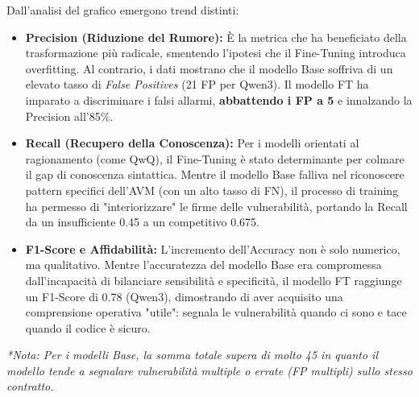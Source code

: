 Dall'analisi del grafico emergono trend distinti:
\begin{itemize}
    \item \textbf{Precision (Riduzione del Rumore):} È la metrica che ha beneficiato della trasformazione più radicale, smentendo l'ipotesi che il Fine-Tuning introduca overfitting. Al contrario, i dati mostrano che il modello Base soffriva di un elevato tasso di \textit{False Positives} (21 FP per Qwen3). Il modello FT ha imparato a discriminare i falsi allarmi, \textbf{abbattendo i FP a 5} e innalzando la Precision all'85\%.
    
    \item \textbf{Recall (Recupero della Conoscenza):} Per i modelli orientati al ragionamento (come QwQ), il Fine-Tuning è stato determinante per colmare il gap di conoscenza sintattica. Mentre il modello Base falliva nel riconoscere pattern specifici dell'AVM (con un alto tasso di FN), il processo di training ha permesso di "interiorizzare" le firme delle vulnerabilità, portando la Recall da un insufficiente 0.45 a un competitivo 0.675.
    
    \item \textbf{F1-Score e Affidabilità:} L'incremento dell'Accuracy non è solo numerico, ma qualitativo. Mentre l'accuratezza del modello Base era compromessa dall'incapacità di bilanciare sensibilità e specificità, il modello FT raggiunge un F1-Score di 0.78 (Qwen3), dimostrando di aver acquisito una comprensione operativa "utile": segnala le vulnerabilità quando ci sono e tace quando il codice è sicuro.
\end{itemize}

\begin{table}[h]
    \centering
    \caption{Dettaglio della Matrice di Confusione per i modelli testati (Test Set: 45 Contratti).}
    \label{tab:confusion_matrix_raw}
    \vspace{0.2cm}
    \small
    \textit{*Nota: Per i modelli Base, la somma totale supera di molto 45 in quanto il modello tende a segnalare vulnerabilità multiple o errate (FP multipli) sullo stesso contratto.}
\end{table}

